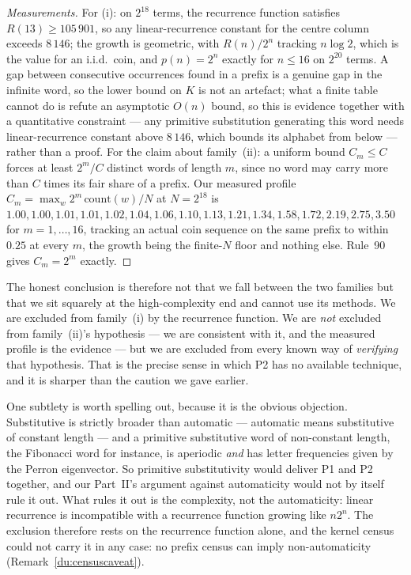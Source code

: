 \documentclass[11pt]{article}
\theoremstyle{definition}
\theoremstyle{remark}
\begin{document}
\begin{proof}[Measurements]
For \textup{(i)}: on $2^{18}$ terms, the recurrence function satisfies $R(13)\ge105\,901$, so any
linear-recurrence constant for the centre column exceeds $8\,146$; the growth is geometric, with
$R(n)/2^{n}$ tracking $n\log 2$, which is the value for an i.i.d.\ coin, and $p(n)=2^{n}$ exactly for
$n\le16$ on $2^{20}$ terms. A gap between consecutive occurrences found in a prefix is a genuine gap in
the infinite word, so the lower bound on $K$ is not an artefact; what a finite table cannot do is
refute an asymptotic $O(n)$ bound, so this is evidence together with a quantitative constraint --- any
primitive substitution generating this word needs linear-recurrence constant above $8\,146$, which
bounds its alphabet from below --- rather than a proof. For the claim about family~\textup{(ii)}: a uniform bound $C_m\le C$ forces at least $2^m/C$ distinct
words of length $m$, since no word may carry more than $C$ times its fair share of a prefix. Our
measured profile $C_m=\max_w2^m\,\mathrm{count}(w)/N$ at $N=2^{18}$ is
$1.00,1.00,1.01,1.01,1.02,1.04,1.06,1.10,1.13,1.21,1.34,1.58,1.72,2.19,2.75,3.50$ for $m=1,\dots,16$,
tracking an actual coin sequence on the same prefix to within $0.25$ at every $m$, the growth being the
finite-$N$ floor and nothing else. Rule~90 gives $C_m=2^m$ exactly.
\end{proof}

The honest conclusion is therefore not that we fall between the two families but that we sit squarely
at the high-complexity end and cannot use its methods. We are excluded from family~\textup{(i)} by the
recurrence function. We are \emph{not} excluded from family~\textup{(ii)}'s hypothesis --- we are
consistent with it, and the measured profile is the evidence --- but we are excluded from every known
way of \emph{verifying} that hypothesis. That is the precise sense in which P2 has
no available technique, and it is sharper than the caution we gave earlier.

One subtlety is worth spelling out, because it is the obvious objection. Substitutive is strictly
broader than automatic --- automatic means substitutive of constant length --- and a primitive
substitutive word of non-constant length, the Fibonacci word for instance, is aperiodic \emph{and} has
letter frequencies given by the Perron eigenvector. So primitive substitutivity would deliver P1 and
P2 together, and our Part~II's argument against automaticity would not by itself rule it out. What
rules it out is the complexity, not the automaticity: linear recurrence is incompatible with a
recurrence function growing like $n2^{n}$. The exclusion therefore rests on the recurrence function
alone, and the kernel census could not carry it in any case: no prefix census can imply
non-automaticity (Remark~\ref{du:censuscaveat}).
\end{document}
